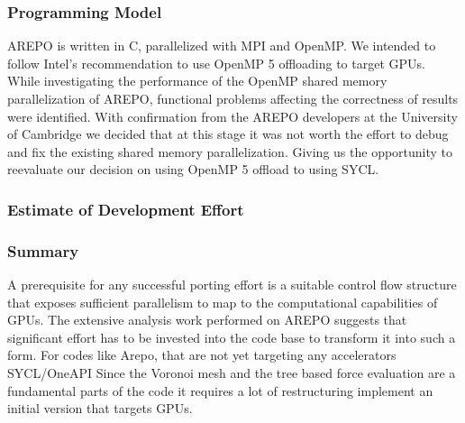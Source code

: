 \documentclass[../main]{subfiles}
\begin{document}
\subsubsection{Programming Model}
AREPO is written in C, parallelized with MPI and OpenMP. We intended to follow Intel’s recommendation to use OpenMP 5 offloading to target GPUs. While investigating the performance of the OpenMP shared memory parallelization of AREPO, functional problems affecting the correctness of results were identified. With confirmation from the AREPO developers at the University of Cambridge we decided that at this stage it was not worth the effort to debug and fix the existing shared memory parallelization. Giving us the opportunity to reevaluate our decision on using OpenMP 5 offload to using SYCL. 

\subsubsection{Estimate of Development Effort}


\subsubsection{Summary}
A prerequisite for any successful porting effort is a suitable control flow structure that exposes sufficient parallelism to map to the computational capabilities of GPUs. The extensive analysis work performed on AREPO suggests that significant effort has to be invested into the code base to transform it into such a form. 
For codes like Arepo, that are not yet targeting any accelerators SYCL/OneAPI 
Since the Voronoi mesh and the tree based force evaluation are a fundamental parts of the code it requires a lot of restructuring implement an initial version that targets GPUs. 




\end{document}
